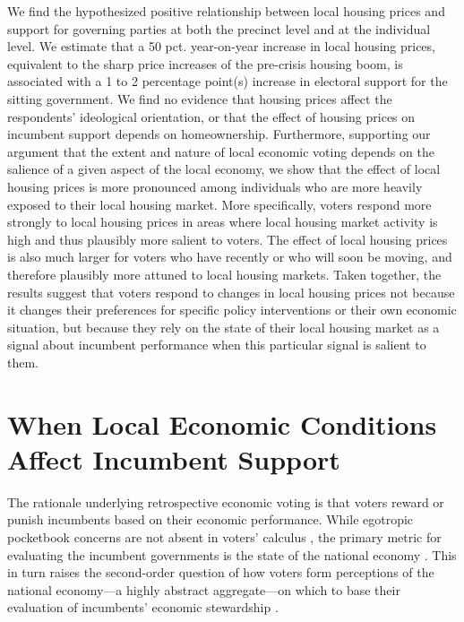 \documentclass[12pt,a4paper]{article}
\begin{document}
	We find the hypothesized positive relationship between local housing prices and support for governing parties at both the precinct level and at the individual level. We estimate that a 50 pct. year-on-year increase in local housing prices, equivalent to the sharp price increases of the pre-crisis housing boom, is associated with a 1 to 2 percentage point(s) increase in electoral support for the sitting government. We find no evidence that housing prices affect the respondents’ ideological orientation, or that the effect of housing prices on incumbent support depends on homeownership. Furthermore, supporting our argument that the extent and nature of local economic voting depends on the salience of a given aspect of the local economy, we show that the effect of local housing prices is more pronounced among individuals who are more heavily exposed to their local housing market. More specifically, voters respond more strongly to local housing prices in areas where local housing market activity is high and thus plausibly more salient to voters. The effect of local housing prices is also much larger for voters who have recently or who will soon be moving, and therefore plausibly more attuned to local housing markets. Taken together, the results suggest that voters respond to changes in local housing prices not because it changes their preferences for specific policy interventions or their own economic situation, but because they rely on the state of their local housing market as a signal about incumbent performance when this particular signal is salient to them.
	
	\section{When Local Economic Conditions Affect Incumbent Support}
	The rationale underlying retrospective economic voting is that voters reward or punish incumbents based on their economic performance. While egotropic pocketbook concerns are not absent in voters’ calculus \citep{healy2017digging, tilley2017pound}, the primary metric for evaluating the incumbent governments is the state of the national economy \citep{kinder1979economic,lewis2013vp}. This in turn raises the second-order question of how voters form perceptions of the national economy—a highly abstract aggregate—on which to base their evaluation of incumbents’ economic stewardship \citep{reeves2012ecologies}. 
	
\end{document}
